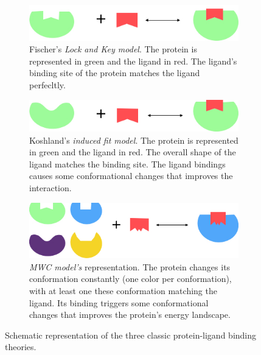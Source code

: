 \documentclass[12pt, b5paper,twoside]{tesi_upf}
\begin{document}
\begin{figure}[htbp]
  
  \centering
    \begin{subfigure}[b]{0.75\textwidth}
	\includegraphics[width=1\linewidth]{../figures/lock_key_model.jpg}
	\caption{Fischer's \textit{Lock and Key model}. The protein is represented in green and the ligand in red. The ligand's binding site of the protein matches the ligand perfecltly.}
	\label{fig:lock_and_key_model}
	\vspace*{4mm}
	\end{subfigure}
	\begin{subfigure}[b]{0.75\textwidth}
	\includegraphics[width=1\linewidth]{../figures/induce_fit_model.jpg}
	\caption{Koshland's \textit{induced fit model}. The protein is represented in green and the ligand in red. The overall shape of the ligand matches the binding site. The ligand bindings causes some conformational changes that improves the interaction.}
	\label{fig:induced_fit_model}
	\vspace*{4mm}
	\end{subfigure}
	\begin{subfigure}[b]{0.75\textwidth}
	\includegraphics[width=1\linewidth]{../figures/mwc_model.jpg}
	\caption{\textit{MWC model's} representation. The protein changes its conformation constantly (one color per conformation), with at least one these conformation matching the ligand. Its binding triggers some conformational changes that improves the protein's energy landscape.}
	\label{fig:mwc_model}
	\vspace*{4mm}
	\end{subfigure}
   \caption[Schematic representation of the three classic protein-ligand binding theories.]{Schematic representation of the three classic protein-ligand binding theories.}

\end{figure}
\end{document}
